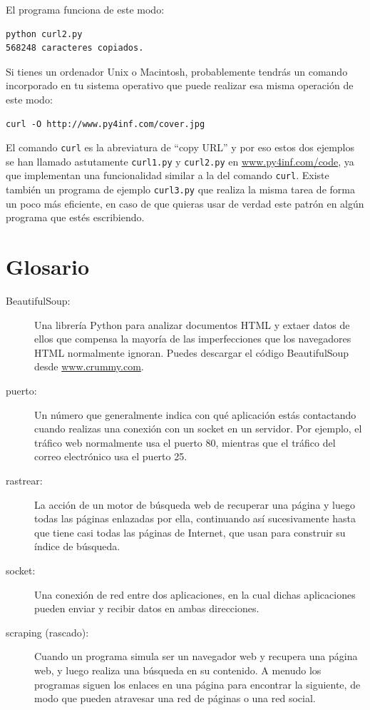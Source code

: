 El programa funciona de este modo:

\beforeverb
\begin{verbatim}
python curl2.py 
568248 caracteres copiados.
\end{verbatim}
\afterverb
%

Si tienes un ordenador Unix o Macintosh, probablemente tendrás un comando
incorporado en tu sistema operativo que puede realizar esa misma operación
de este modo:

\beforeverb
\begin{verbatim}
curl -O http://www.py4inf.com/cover.jpg
\end{verbatim}
\afterverb
%
El comando {\tt curl} es la abreviatura de ``copy URL'' y por eso estos dos
ejemplos se han llamado astutamente {\tt curl1.py} y {\tt curl2.py} en
\url{www.py4inf.com/code}, ya que implementan una funcionalidad similar
a la del comando {\tt curl}. Existe también un programa de ejemplo {\tt curl3.py}
que realiza la misma tarea de forma un poco más eficiente, en caso de
que quieras usar de verdad este patrón en algún programa que estés escribiendo.

\section{Glosario}

\begin{description}

\item[BeautifulSoup:] Una librería Python para analizar documentos HTML
y extaer datos de ellos
que compensa la mayoría de las imperfecciones que los navegadores HTML
normalmente ignoran.
Puedes descargar el código BeautifulSoup
desde
\url{www.crummy.com}.

\item[puerto:] Un número que generalmente indica con qué aplicación
estás contactando cuando realizas una conexión con un socket en un servidor.
Por ejemplo, el tráfico web normalmente usa el puerto 80, mientras que el tráfico
del correo electrónico usa el puerto 25.

\item[rastrear:] La acción de un motor de búsqueda web de recuperar una página
y luego todas las páginas enlazadas por ella, continuando así sucesivamente hasta que
tiene casi todas las páginas de Internet, que
usan para construir su índice de búsqueda.

\item[socket:] Una conexión de red entre dos aplicaciones,
en la cual dichas aplicaciones pueden enviar y recibir datos en ambas direcciones.

\item[scraping (rascado):] Cuando un programa simula ser un navegador web y
recupera una página web, y luego realiza una búsqueda en su contenido.
A menudo los programas siguen los enlaces en una página para encontrar la
siguiente, de modo que pueden atravesar una red de páginas o una red social.

\end{description}


